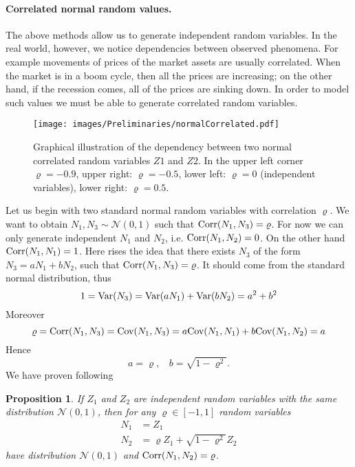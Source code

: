 \documentclass[a4paper,11pt, twoside]{book}
\newtheorem{prop}[thm]{Proposition}
\theoremstyle{definition}
\theoremstyle{remark}
\newcounter{example}[chapter]
\def\Var{{\rm Var}}
\def\Cov{{\hbox{Cov}}}
\def\Corr{{\hbox{Corr}}}
\begin{document}
\paragraph{Correlated normal random values.} The above methods allow us to generate independent random variables. In the real world, however, we notice dependencies between observed phenomena. For example movements of prices of the market assets are usually correlated. When the market is in a boom cycle, then all the prices are increasing; on the other hand, if the recession comes, all of the prices are sinking down.
In order to model such values we must be able to generate correlated random variables.

\begin{figure}[!ht]
\centering
 \texttt{[image: images/Preliminaries/normalCorrelated.pdf]}
\caption{Graphical illustration of the dependency between two normal correlated random variables $Z1$ and $Z2$. In the upper left corner $\varrho = -0.9$, upper right: $\varrho = -0.5$, lower left: $\varrho = 0$ (independent variables), lower right: $\varrho = 0.5$.}
\end{figure}

Let us begin with two standard normal random variables with correlation $\varrho$. We want to obtain $N_1, N_3 \sim \mathcal{N}(0,1)$ such that $\Corr(N_1, N_3) = \varrho$.  For now we can only generate independent $N_1$ and $N_2$, i.e. $\Corr(N_1, N_2) = 0$. On the other hand $\Corr(N_1, N_1) = 1$. Here rises the idea that there exists $N_3$ of the form $N_3 = a N_1 + b N_2$, such that $\Corr(N_1, N_3) = \varrho$.
It should come from the standard normal distribution, thus
\[ 1 = \Var(N_3) = \Var( a N_1) +  \Var(b N_2) = a^2 + b^2 \]
Moreover
\[ \varrho = \Corr(N_1, N_3) = \Cov(N_1, N_3) = a\Cov(N_1, N_1) + b\Cov(N_1, N_2) = a \]
Hence
\[ a = \varrho,\ \ \ \ b = \sqrt{1 - \varrho^2}. \]
We have proven following
\begin{prop}
 \label{prop:corrNorm}
 If $Z_1$ and $Z_2$ are independent random variables with the same distribution $\mathcal{N}(0,1)$, then for any $\varrho \in [-1,1]$ random variables
 \begin{align*}
 N_1 &= Z_1 \\
 N_2 &= \varrho Z_1 + \sqrt{1 - \varrho^2} Z_2
 \end{align*}
 have distribution $\mathcal{N}(0,1)$ and $\Corr(N_1, N_2) = \varrho$.
\end{prop}
\end{document}
